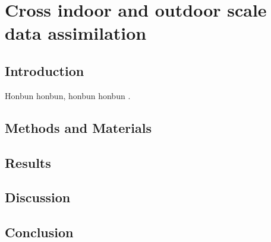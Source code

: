 \chapter{Cross indoor and outdoor scale data assimilation}

\section{Introduction}

Honbun honbun, honbun honbun \citep{zhao_crop_2019}. 




\section{Methods and Materials}


\section{Results}

\section{Discussion}

\section{Conclusion}
